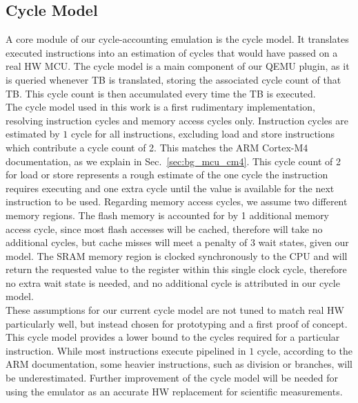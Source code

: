 \documentclass[english]{tudscrartcl}
\begin{document}
		\subsection{Cycle Model}
			\label{sec:sysmodel_cyclemodel}
			A core module of our cycle-accounting emulation is the cycle model.
			It translates executed instructions into an estimation of cycles that would have passed on a real \ac{HW} MCU.
			The cycle model is a main component of our QEMU plugin, as it is queried whenever TB is translated, storing the associated cycle count of that TB.
			This cycle count is then accumulated every time the TB is executed.
			\\
			The cycle model used in this work is a first rudimentary implementation, resolving instruction cycles and memory access cycles only.
			Instruction cycles are estimated by $1$ cycle for all instructions, excluding load and store instructions which contribute a cycle count of 2.
			This matches the ARM Cortex-M4 documentation, as we explain in Sec.~\ref{sec:bg_mcu_cm4}.
			This cycle count of 2 for load or store represents a rough estimate of the one cycle the instruction requires executing and one extra cycle until the value is available for the next instruction to be used.
			Regarding memory access cycles, we assume two different memory regions.
			The flash memory is accounted for by 1 additional memory access cycle, since most flash accesses will be cached, therefore will take no additional cycles, but cache misses will meet a penalty of 3 wait states, given our model.
			The SRAM memory region is clocked synchronously to the \ac{CPU} and will return the requested value to the register within this single clock cycle, therefore no extra wait state is needed, and no additional cycle is attributed in our cycle model.
			\\
			These assumptions for our current cycle model are not tuned to match real \ac{HW} particularly well, but instead chosen for prototyping and a first proof of concept.
			This cycle model provides a lower bound to the cycles required for a particular instruction.
			While most instructions execute pipelined in $1$ cycle, according to the ARM documentation, some heavier instructions, such as division or branches, will be underestimated.
			Further improvement of the cycle model will be needed for using the emulator as an accurate \ac{HW} replacement for scientific measurements.
\end{document}
